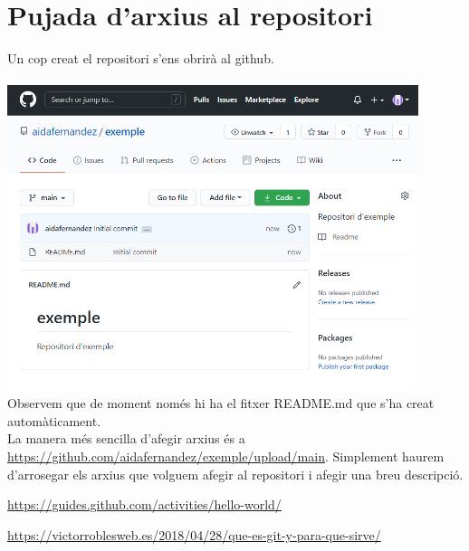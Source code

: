 \documentclass[9pt,a4paper]{article}
\begin{document}
\section{Pujada d'arxius al repositori}
Un cop creat el repositori s'ens obrirà al github. \\\\
\includegraphics[width=12cm]{repo}\\
Observem que de moment només hi ha el fitxer README.md que s'ha creat automàticament.\\

La manera més sencilla d'afegir arxius és a \url{https://github.com/aidafernandez/exemple/upload/main}.
Simplement haurem d'arrosegar els arxius que volguem afegir al repositori i afegir una breu descripció.


\clearpage
\begin{thebibliography}{x}
\bibitem{}
\url{https://guides.github.com/activities/hello-world/}

\bibitem{}
\url{https://victorroblesweb.es/2018/04/28/que-es-git-y-para-que-sirve/}

\end{thebibliography}
\end{document}
